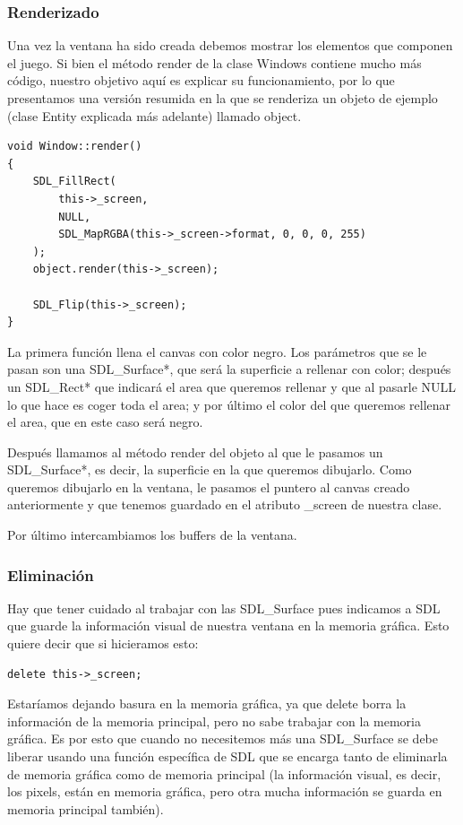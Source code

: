 \documentclass[parskip=half*]{scrartcl}
\begin{document}
			\subsubsection{Renderizado}
				Una vez la ventana ha sido creada debemos mostrar los elementos que componen el juego. Si bien el m\'etodo render de la clase Windows contiene mucho m\'as c\'odigo, nuestro objetivo aqu\'i es explicar su funcionamiento, por lo que presentamos una versi\'on resumida en la que se renderiza un objeto de ejemplo (clase Entity explicada m\'as adelante) llamado object.

				\begin{verbatim}
void Window::render()
{
    SDL_FillRect(
    	this->_screen,
    	NULL,
    	SDL_MapRGBA(this->_screen->format, 0, 0, 0, 255)
    );
    object.render(this->_screen);

    SDL_Flip(this->_screen);
}
				\end{verbatim}

				La primera funci\'on llena el canvas con color negro. Los par\'ametros que se le pasan son una SDL\_Surface*, que ser\'a la superficie a rellenar con color; despu\'es un SDL\_Rect* que indicar\'a el area que queremos rellenar y que al pasarle NULL lo que hace es coger toda el area; y por \'ultimo el color del que queremos rellenar el area, que en este caso ser\'a negro. 

				Despu\'es llamamos al m\'etodo render del objeto al que le pasamos un SDL\_Surface*, es decir, la superficie en la que queremos dibujarlo. Como queremos dibujarlo en la ventana, le pasamos el puntero al canvas creado anteriormente y que tenemos guardado en el atributo \_screen de nuestra clase.

				Por \'ultimo intercambiamos los buffers de la ventana.

			\subsubsection{Eliminaci\'on}
				Hay que tener cuidado al trabajar con las SDL\_Surface pues indicamos a SDL que guarde la informaci\'on visual de nuestra ventana en la memoria gr\'afica. Esto quiere decir que si hicieramos esto:

				\begin{verbatim}
delete this->_screen;
				\end{verbatim}

				Estar\'iamos dejando basura en la memoria gr\'afica, ya que delete borra la informaci\'on de la memoria principal, pero no sabe trabajar con la memoria gr\'afica. Es por esto que cuando no necesitemos m\'as una SDL\_Surface se debe liberar usando una funci\'on espec\'ifica de SDL que se encarga tanto de eliminarla de memoria gr\'afica como de memoria principal (la informaci\'on visual, es decir, los pixels, est\'an en memoria gr\'afica, pero otra mucha informaci\'on se guarda en memoria principal tambi\'en).
\end{document}
